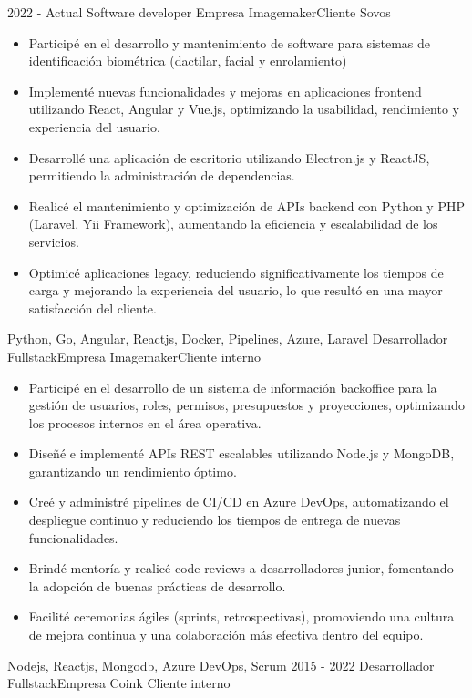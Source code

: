 %
%
%
\begin{experiences}
  \experience
    {2022 - Actual}  {Software developer} {Empresa Imagemaker}{Cliente Sovos}
    {} {
        \begin{itemize}
          \item Participé en el desarrollo y mantenimiento de software para sistemas de identificación biométrica (dactilar, facial y enrolamiento) 
          \item Implementé nuevas funcionalidades y mejoras en aplicaciones frontend utilizando React, Angular y Vue.js, optimizando la usabilidad, rendimiento y experiencia del usuario.
          \item Desarrollé una aplicación de escritorio utilizando Electron.js y ReactJS, permitiendo la administración de dependencias.
          \item Realicé el mantenimiento y optimización de APIs backend con Python y PHP (Laravel, Yii Framework), aumentando la eficiencia y escalabilidad de los servicios.
          \item Optimicé aplicaciones legacy, reduciendo significativamente los tiempos de carga y mejorando la experiencia del usuario, lo que resultó en una mayor satisfacción del cliente.
        \end{itemize}
       }
       { Python, Go, Angular, Reactjs, Docker, Pipelines, Azure, Laravel}
  \emptySeparator
  \experience
    {}   {Desarrollador Fullstack}{Empresa Imagemaker}{Cliente interno}
    {} {
        \begin{itemize}
          \item Participé en el desarrollo de un sistema de información backoffice para la gestión de usuarios, roles, permisos, presupuestos y proyecciones, optimizando los procesos internos en el área operativa.
          \item Diseñé e implementé APIs REST escalables utilizando Node.js y MongoDB, garantizando un rendimiento óptimo.
          \item Creé y administré pipelines de CI/CD en Azure DevOps, automatizando el despliegue continuo y reduciendo los tiempos de entrega de nuevas funcionalidades.
          \item Brindé mentoría y realicé code reviews a desarrolladores junior, fomentando la adopción de buenas prácticas de desarrollo.
          \item Facilité ceremonias ágiles (sprints, retrospectivas), promoviendo una cultura de mejora continua y una colaboración más efectiva dentro del equipo.
        \end{itemize}
       }
       { Nodejs, Reactjs, Mongodb, Azure DevOps, Scrum }
  \emptySeparator  
  \experience
    {2015 - 2022} {Desarrollador Fullstack}{Empresa Coink} {Cliente interno}
    {}    {

}
\end{experiences}
